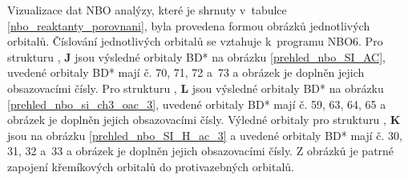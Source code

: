 \documentclass[
digital, %
table,   %
nolof,     %
nolot,     %
oneside,
]{fithesis3}
\begin{document}
Vizualizace dat NBO analýzy, které je shrnuty v~tabulce \ref{nbo_reaktanty_porovnani}, byla provedena formou obrázků jednotlivých orbitalů. Číslování jednotlivých orbitalů se vztahuje k~programu NBO6. Pro strukturu , \textbf{J} jsou výsledné orbitaly BD* na obrázku \ref{prehled_nbo_SI_AC}, uvedené orbitaly BD* mají č. 70, 71, 72 a~73 a obrázek je doplněn jejich obsazovacími čísly. Pro strukturu , \textbf{L} jsou výsledné orbitaly BD* na obrázku \ref{prehled_nbo_si_ch3_oac_3}, uvedené orbitaly BD* mají č. 59, 63, 64, 65 a obrázek je doplněn jejich obsazovacími čísly. Výledné orbitaly pro strukturu , \textbf{K} jsou na obrázku \ref{prehled_nbo_SI_H_ac_3} a uvedené orbitaly BD* mají č. 30, 31, 32 a~33 a obrázek je doplněn jejich obsazovacími čísly. Z obrázků je patrné zapojení křemíkových orbitalů do protivazebných orbitalů. \\
\end{document}
